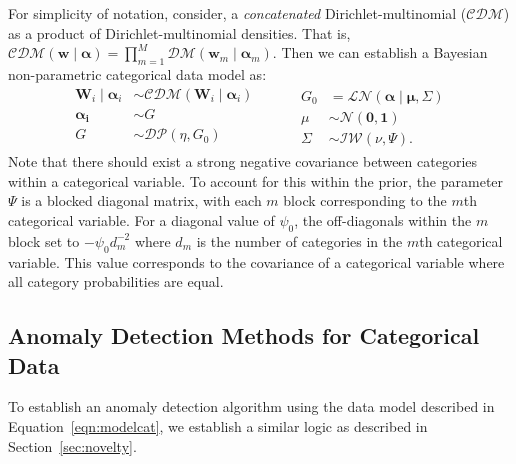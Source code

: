   For simplicity of notation, consider, a \emph{concatenated} Dirichlet-multinomial 
  ($\mathcal{CDM}$) as a product of Dirichlet-multinomial densities.  That is, 
  $\mathcal{CDM}(\bm{w}\mid\bm{\alpha}) = \prod_{m = 1}^M\mathcal{DM}(\bm{w}_m\mid\bm{\alpha}_m)$.
  Then we can establish a Bayesian non-parametric categorical data model as:
  \begin{equation}
    \label{eqn:modelcat}
    \begin{aligned}
      \bm{W}_i \mid \bm{\alpha}_i &\sim \mathcal{CDM}\left(\bm{W}_i\mid\bm{\alpha}_i\right)\\
      \bm{\alpha_i} &\sim G\\
      G &\sim \mathcal{DP}\left(\eta, G_0\right)\\
    \end{aligned}
    ~\hspace{1cm}
    \begin{aligned}
    G_0 &= \mathcal{LN}\left(\bm{\alpha}\mid\bm{\mu},\Sigma\right)\\
    \mu &\sim \mathcal{N}\left(\bm{0},\bm{1}\right)\\
    \Sigma &\sim \mathcal{IW}\left(\nu, \Psi\right).
    \end{aligned}
  \end{equation}
  Note that there should exist a strong negative covariance between categories 
  within a categorical variable.  To account for this within the prior, the 
  parameter $\Psi$ is a blocked diagonal matrix, with each $m$ block 
  corresponding to the $m$th categorical variable.  For a diagonal value of 
  $\psi_0$, the off-diagonals within the $m$ block set to $-\psi_0 d_m^{-2}$ 
  where $d_m$ is the number of categories in the $m$th categorical variable.
  This value corresponds to the covariance of a categorical variable where all 
  category probabilities are equal.

\subsection{Anomaly Detection Methods for Categorical Data}
To establish an anomaly detection algorithm using the data model described in 
  Equation~\ref{eqn:modelcat}, we establish a similar logic as described in
  Section~\ref{sec:novelty}.







